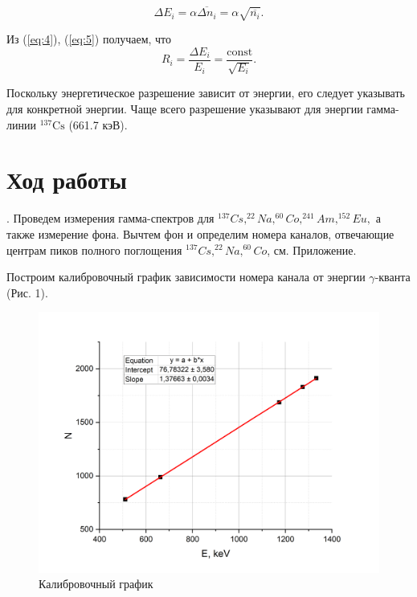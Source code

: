 \documentclass[a4paper,12pt]{article} %
\begin{document}
\begin{equation}
\Delta E_i=\alpha\overline{\Delta n_i}=\alpha\sqrt{\overline{n_i}}.
\label{eq:5}
\end{equation}

\medskip


\noindent Из (\ref{eq:4}), (\ref{eq:5}) получаем, что
\begin{equation}
R_i=\frac{\Delta E_i}{E_i}=\frac{\text{const}}{\sqrt{E_i}}.
\label{eq:6}
\end{equation}

\medskip

\noindent Поскольку энергетическое разрешение зависит от энергии, его следует указывать для конкретной энергии. Чаще всего разрешение указывают для энергии гамма-линии $^{137}\text{Cs}$ (661.7 кэВ).

\newpage

\section{Ход работы}

. Проведем измерения гамма-спектров для $^{137}Cs, ^{22}Na, ^{60}Co, ^{241}Am, ^{152}Eu,$ а также измерение фона. Вычтем фон и определим номера каналов, отвечающие центрам пиков полного поглощения $^{137}Cs, ^{22}Na, ^{60}Co$, см. Приложение.

\medskip

\noindent  Построим калибровочный график зависимости номера канала от энергии $\gamma$-кванта (Рис. 1).

\medskip


\begin{figure}[h!]
    \centering
    \includegraphics[scale=0.5]{kalibrovka.png}
    \caption{Калибровочный график}
    
\end{figure}
\end{document}
